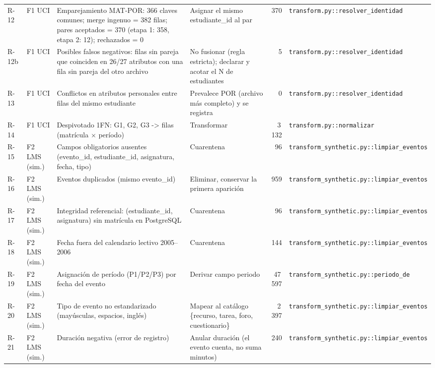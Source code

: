 \begin{tabular}{>{\raggedright\arraybackslash}p{1.0cm}>{\raggedright\arraybackslash}p{1.9cm}>{\raggedright\arraybackslash}p{8.6cm}>{\raggedright\arraybackslash}p{4.4cm}r>{\raggedright\arraybackslash}p{4.6cm}}
R-12 & F1 UCI & Emparejamiento MAT-POR: 366 claves comunes; merge ingenuo = 382 filas; pares aceptados = 370 (etapa 1: 358, etapa 2: 12); rechazados = 0 & Asignar el mismo estudiante\_id al par & 370 & \texttt{transform.py::\allowbreak resolver\_identidad} \\
R-12b & F1 UCI & Posibles falsos negativos: filas sin pareja que coinciden en 26/27 atributos con una fila sin pareja del otro archivo & No fusionar (regla estricta); declarar y acotar el N de estudiantes & 5 & \texttt{transform.py::\allowbreak resolver\_identidad} \\
R-13 & F1 UCI & Conflictos en atributos personales entre filas del mismo estudiante & Prevalece POR (archivo más completo) y se registra & 0 & \texttt{transform.py::\allowbreak resolver\_identidad} \\
R-14 & F1 UCI & Despivotado 1FN: G1, G2, G3 -> filas (matrícula $\times$ período) & Transformar & 3\,132 & \texttt{transform.py::\allowbreak normalizar} \\
R-15 & F2 LMS (sim.) & Campos obligatorios ausentes (evento\_id, estudiante\_id, asignatura, fecha, tipo) & Cuarentena & 96 & \texttt{transform\_synthetic.py::\allowbreak limpiar\_eventos} \\
R-16 & F2 LMS (sim.) & Eventos duplicados (mismo evento\_id) & Eliminar, conservar la primera aparición & 959 & \texttt{transform\_synthetic.py::\allowbreak limpiar\_eventos} \\
R-17 & F2 LMS (sim.) & Integridad referencial: (estudiante\_id, asignatura) sin matrícula en PostgreSQL & Cuarentena & 96 & \texttt{transform\_synthetic.py::\allowbreak limpiar\_eventos} \\
R-18 & F2 LMS (sim.) & Fecha fuera del calendario lectivo 2005–2006 & Cuarentena & 144 & \texttt{transform\_synthetic.py::\allowbreak limpiar\_eventos} \\
R-19 & F2 LMS (sim.) & Asignación de período (P1/P2/P3) por fecha del evento & Derivar campo periodo & 47\,597 & \texttt{transform\_synthetic.py::\allowbreak periodo\_de} \\
R-20 & F2 LMS (sim.) & Tipo de evento no estandarizado (mayúsculas, espacios, inglés) & Mapear al catálogo \{recurso, tarea, foro, cuestionario\} & 2\,397 & \texttt{transform\_synthetic.py::\allowbreak limpiar\_eventos} \\
R-21 & F2 LMS (sim.) & Duración negativa (error de registro) & Anular duración (el evento cuenta, no suma minutos) & 240 & \texttt{transform\_synthetic.py::\allowbreak limpiar\_eventos} \\

\end{tabular}
